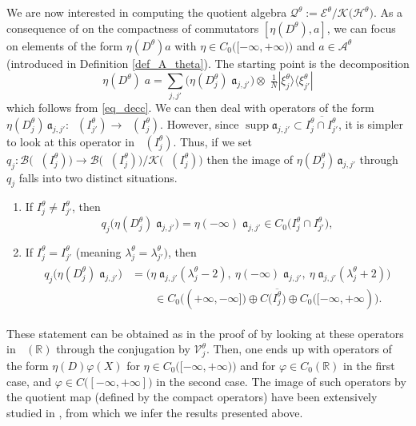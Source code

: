 \documentclass[11pt]{article}
\def\a{\mathfrak a}
\def\AA{\mathcal A}
\def\B{\mathscr B}
\def\EE{\mathscr E}
\def\Hrond{\mathscr H}
\def\K{\mathscr K}
\def\QQ{\mathcal Q}
\def\R{\mathbb R}
\def\V{\mathcal V}
\def\supp{\mathop{\mathrm{supp}}\nolimits}
\def\ltwo{\mathop{\mathrm{L}^2}\nolimits}
\begin{document}
We are now interested in computing the quotient algebra $\QQ^\theta:=\EE^\theta / \K\big(\Hrond^\theta\big)$. 
As a consequence of \cite[Lem.~3.9]{APRR} on the compactness of commutators $[\eta(D^\theta),a]$, we can focus on elements of the form $\eta(D^\theta)a$
with $\eta \in C_0\big([-\infty,+\infty)\big)$ and $a\in \AA^\theta$ 
(introduced in Definition \ref{def_A_theta}).
The starting point is the decomposition
\begin{equation}\label{eq:sum}
\eta(D^\theta)\;\!a
=  \sum_{j,j'}
\big(\eta(D^\theta_{j})\;\!\a_{j,j'}\big)\otimes \;\!\tfrac{1}{N}|\xi^\theta_j\rangle \langle \xi^\theta_{j'}|
\end{equation}
which follows from \eqref{eq_decc}.
We can then deal with operators of the form
$\eta(D^\theta_{j})\,\!\a_{j,j'}: \ltwo(I^\theta_{j'})\to \ltwo(I^\theta_j)$.
However, since $\supp \a_{j,j'}\subset \overline{I_j^\theta \cap I_{j'}^\theta}$, it is 
simpler to look at this operator in $\ltwo(I_j^\theta)$.
Thus, if we set $q_{j}:\B\big(\ltwo(I_{j}^\theta)\big)\to \B\big(\ltwo(I_{j}^\theta) \big)/ \K\big(\ltwo(I_{j}^\theta) \big)$ then the image of  $\eta(D^\theta_{j})\,\!\a_{j,j'}$ through
$q_{j}$ falls into two distinct situations.
\begin{enumerate}
\item[$(i)$] If $I_j^\theta \neq I^\theta_{j'}$, then 
\begin{equation}\label{eq:q1}
q_{j}\big(\eta(D^\theta_{j})\;\!\a_{j,j'}\big) 
=  \eta(-\infty)\;\!\a_{j,j'} \in   C_0\big(I^\theta_{j}\cap I^\theta_{j'}\big),
\end{equation}
\item[$(ii)$]   If $I_j^\theta=I_{j'}^\theta$ (meaning $\lambda^\theta_j=\lambda^\theta_{j'})$, then 
\begin{align}\label{eq:q2}
\begin{split}
q_{j}\big(\eta(D^\theta_{j})\;\!\a_{j,j'}\big)
& = \Big( \eta\;\!\a_{j,j'}(\lambda_{j}^\theta-2),\ \eta(-\infty)\;\!\a_{j,j'},\ 
 \eta\;\!\a_{j,j'}(\lambda_{j}^\theta+2) \Big) \\ 
& \qquad \in
C_0\big((+\infty,-\infty]\big) \oplus C\big(\overline {I^\theta_{j}}\big) \oplus 
C_0\big([-\infty,+\infty)\big).
\end{split}
\end{align}
\end{enumerate}
These statement can be obtained as in the proof of \cite[Lem.~3.8]{APRR} by looking
at these operators in $\ltwo(\R)$ through the conjugation by $\V_{j}^\theta$. Then, one ends up with operators of the form $\eta(D)\varphi(X)$ for $\eta \in C_0\big([-\infty,+\infty)\big)$
and for $\varphi\in C_0(\R)$ in the first case, and $\varphi \in C\big([-\infty,+\infty]\big)$
in the second case. The image of such operators by the quotient map (defined by the compact operators) have been extensively studied in \cite[Sec.~4.4]{Ri}, from which we infer the results presented above. 
\end{document}
